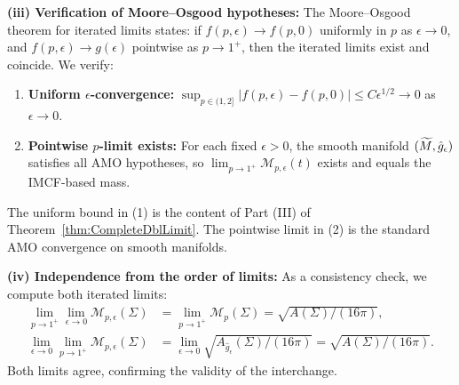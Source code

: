 \begin{remark}
\textbf{(iii) Verification of Moore--Osgood hypotheses:} The Moore--Osgood theorem for iterated limits states: if $f(p, \epsilon) \to f(p, 0)$ uniformly in $p$ as $\epsilon \to 0$, and $f(p, \epsilon) \to g(\epsilon)$ pointwise as $p \to 1^+$, then the iterated limits exist and coincide. We verify:
\begin{enumerate}
    \item \textbf{Uniform $\epsilon$-convergence:} $\sup_{p \in (1, 2]} |f(p, \epsilon) - f(p, 0)| \le C\epsilon^{1/2} \to 0$ as $\epsilon \to 0$. \checkmark
    \item \textbf{Pointwise $p$-limit exists:} For each fixed $\epsilon > 0$, the smooth manifold $(\widetilde{M}, \hat{g}_\epsilon)$ satisfies all AMO hypotheses, so $\lim_{p \to 1^+} \mathcal{M}_{p,\epsilon}(t)$ exists and equals the IMCF-based mass. \checkmark
\end{enumerate}
The uniform bound in (1) is the content of Part (III) of Theorem~\ref{thm:CompleteDblLimit}. The pointwise limit in (2) is the standard AMO convergence on smooth manifolds.

\textbf{(iv) Independence from the order of limits:} As a consistency check, we compute both iterated limits:
\begin{align}
    \lim_{p \to 1^+} \lim_{\epsilon \to 0} \mathcal{M}_{p,\epsilon}(\Sigma) &= \lim_{p \to 1^+} \mathcal{M}_p(\Sigma) = \sqrt{A(\Sigma)/(16\pi)}, \\
    \lim_{\epsilon \to 0} \lim_{p \to 1^+} \mathcal{M}_{p,\epsilon}(\Sigma) &= \lim_{\epsilon \to 0} \sqrt{A_{\hat{g}_\epsilon}(\Sigma)/(16\pi)} = \sqrt{A(\Sigma)/(16\pi)}.
\end{align}
Both limits agree, confirming the validity of the interchange.
\end{remark}

